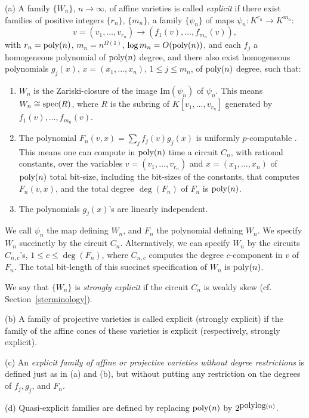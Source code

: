 \documentclass[11pt]{article}
\begin{document}
\begin{defn} \label{dexpvariety}
\noindent (a) A family $\{W_n\}$, $n\rightarrow \infty$,  of affine varieties is called 
{\em explicit} 
if there exist families of positive integers $\{r_n\}$, $\{m_n\}$,  a family $\{\psi_n\}$ of maps
$\psi_n: K^{r_n} \rightarrow K^{m_n}$:
\begin{equation} \label{eqpsiexp}
v=(v_1,\ldots,v_{r_n}) \rightarrow (f_1(v),\ldots,f_{m_n}(v)),
\end{equation}
with $r_n={\mbox {poly}}(n)$, $m_n=n^{\Omega(1)}$, $\log m_n = O({\mbox {poly}}(n))$, 
and each $f_j$  a homogeneous polynomial of ${\mbox {poly}}(n)$ degree, and there also exist
homogeneous polynomials $g_j(x)$, $x=(x_1,\ldots,x_n)$,  $1\le j \le m_n$, of ${\mbox {poly}}(n)$ degree,
such that:
\begin{enumerate} 
\item  $W_n$ is the Zariski-closure of the image $\mbox{Im}(\psi_n)$ of $\psi_n$. This means $W_n \cong {\mbox {spec}}(R)$, where
$R$ is the subring of $K[v_1,\ldots,v_{r_n}]$ generated by $f_1(v),\ldots,f_{m_n}(v)$.
\item The polynomial $F_n(v,x)=\sum_j f_j(v) g_j(x)$ is uniformly
$p$-computable \cite{valiant2}. This means one can compute in ${\mbox {poly}}(n)$ time a circuit $C_n$,
with rational constants,  over the variables $v=(v_1,\ldots,v_{r_n})$ and 
$x=(x_1,\ldots,x_n)$ of ${\mbox {poly}}(n)$  total bit-size, including the bit-sizes of 
the constants,   that computes $F_n(v,x)$, and the  total degree  $\deg(F_n)$ of $F_n$ 
is ${\mbox {poly}}(n)$.
\item The polynomials $g_j(x)$'s are linearly independent.
\end{enumerate}



We call $\psi_n$ the map defining $W_n$, and $F_n$ the polynomial defining 
$W_n$. We specify $W_n$ succinctly by the circuit $C_n$. 
Alternatively, we can specify $W_n$ by the circuits $C_{n,c}$'s, $1 \le c \le 
\deg(F_n)$,  where $C_{n,c}$  computes the degree $c$-component in $v$ of $F_n$. The total bit-length of this succinct 
specification of $W_n$ is  ${\mbox {poly}}(n)$.

We say that $\{W_n\}$ is {\em strongly explicit} if the circuit $C_n$ is weakly skew (cf.
Section~\ref{sterminology}).

\noindent (b) A family of projective varieties is called explicit (strongly explicit) 
if the family of the affine cones
of these varieties is explicit (respectively, strongly explicit).

\noindent (c) An {\em explicit  family of  affine or projective varieties
without  degree restrictions} 
is defined just as in (a) and (b), 
but without putting any restriction on the degrees of $f_j,g_j$, and $F_n$. 

\noindent (d) Quasi-explicit families  are defined by replacing ${\mbox {poly}}(n)$ by $2^{{\mbox {polylog}}(n)}$. 
\end{defn}
\end{document}
